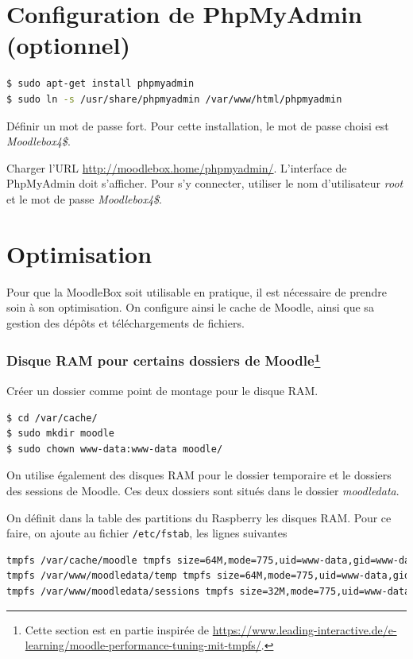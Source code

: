 \documentclass[11pt]{article}
\begin{document}
\section{Configuration de PhpMyAdmin (optionnel)}

\begin{lstlisting}[language=bash]
$ sudo apt-get install phpmyadmin
$ sudo ln -s /usr/share/phpmyadmin /var/www/html/phpmyadmin
\end{lstlisting}
Définir un mot de passe fort. Pour cette installation, le mot de passe choisi est \emph{Moodlebox4\$}.

\begin{verification}
Charger l'URL \url{http://moodlebox.home/phpmyadmin/}. L'interface de PhpMyAdmin doit s'afficher. Pour s'y connecter, utiliser le nom d'utilisateur \emph{root} et le mot de passe \emph{Moodlebox4\$}.
\end{verification}

\section{Optimisation}

Pour que la MoodleBox soit utilisable en pratique, il est nécessaire de prendre soin à son optimisation. On configure ainsi le cache de Moodle, ainsi que sa gestion des dépôts et téléchargements de fichiers.

\subsubsection[Disque RAM pour certains dossiers de Moodle]{Disque RAM pour certains dossiers de Moodle\footnote{Cette section est en partie inspirée de \url{https://www.leading-interactive.de/e-learning/moodle-performance-tuning-mit-tmpfs/}.}}

Créer un dossier comme point de montage pour le disque RAM.
\begin{lstlisting}[language=bash]
$ cd /var/cache/
$ sudo mkdir moodle
$ sudo chown www-data:www-data moodle/
\end{lstlisting}

On utilise également des disques RAM pour le dossier temporaire et le dossiers des sessions de Moodle. Ces deux dossiers sont situés dans le dossier \emph{moodledata}.

On définit dans la table des partitions du Raspberry les disques RAM. Pour ce faire, on ajoute au fichier \lstinline{/etc/fstab}, les lignes suivantes
\begin{lstlisting}[language=bash]
tmpfs /var/cache/moodle tmpfs size=64M,mode=775,uid=www-data,gid=www-data 0 0
tmpfs /var/www/moodledata/temp tmpfs size=64M,mode=775,uid=www-data,gid=www-data 0 0
tmpfs /var/www/moodledata/sessions tmpfs size=32M,mode=775,uid=www-data,gid=www-data 0 0
\end{lstlisting}
\end{document}
